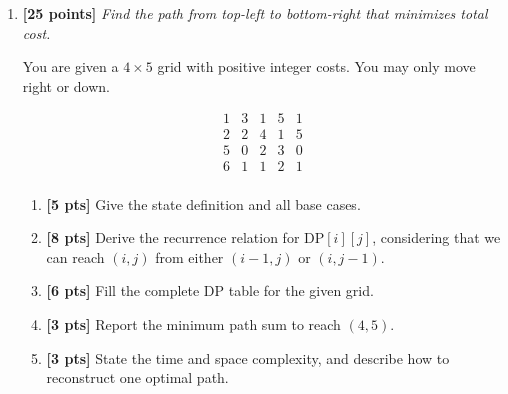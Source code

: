 \documentclass[9pt]{book}
\begin{document}
\begin{enumerate}[label=\arabic*.]
\begin{enumerate}[label=(\alph*)]
    \item \textbf{[8 pts]} Derive the recurrence. (Hint: consider where the last character of $s_3[i+j]$ came from.)

    \item \textbf{[6 pts]} Fill enough of the DP table to determine $\mathrm{Inter}[5][5]$ (whether $s_3[1..10]$ is an interleaving of $s_1$ and $s_2$).

    \item \textbf{[3 pts]} Report whether $s_3$ can be formed as an interleaving of $s_1$ and $s_2$.

    \item \textbf{[3 pts]} Give asymptotic running time and space complexity.
\end{enumerate}

\bigskip


\item \textbf{[25 points]} \textit{Find the path from top-left to bottom-right that minimizes total cost.}

You are given a $4 \times 5$ grid with positive integer costs. You may only move right or down.

\[
\begin{array}{ccccc}
1 & 3 & 1 & 5 & 1 \\
2 & 2 & 4 & 1 & 5 \\
5 & 0 & 2 & 3 & 0 \\
6 & 1 & 1 & 2 & 1 \\
\end{array}
\]


\begin{enumerate}[label=(\alph*)]
    \item \textbf{[5 pts]} Give the state definition and all base cases.

    \item \textbf{[8 pts]} Derive the recurrence relation for $\mathrm{DP}[i][j]$, considering that we can reach $(i,j)$ from either $(i-1,j)$ or $(i,j-1)$.

    \item \textbf{[6 pts]} Fill the complete $\mathrm{DP}$ table for the given grid.

    \item \textbf{[3 pts]} Report the minimum path sum to reach $(4,5)$.

    \item \textbf{[3 pts]} State the time and space complexity, and describe how to reconstruct one optimal path.
\end{enumerate}

\end{enumerate}
\end{document}
